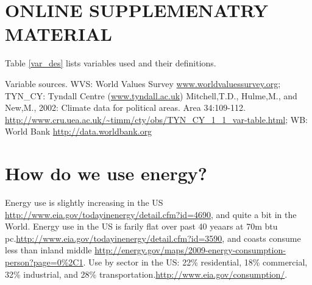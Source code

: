 \documentclass[10pt, letterpaper]{article}
\begin{document}
\begin{spacing}{1.4}







\newpage
\section{ONLINE SUPPLEMENATRY MATERIAL}

Table
\ref{var_des} lists variables used and their definitions.



{\scriptsize \noindent Variable sources. WVS: World Values Survey \url{www.worldvaluessurvey.org};
TYN\_CY: Tyndall Centre (\url{www.tyndall.ac.uk}) Mitchell,T.D., Hulme,M., and
New,M., 2002: Climate data for political areas. Area
34:109-112. \url{http://www.cru.uea.ac.uk/~timm/cty/obs/TYN_CY_1_1_var-table.html};
WB: World Bank \url{http://data.worldbank.org}}




\section{How do we use energy?}

Energy use is slightly increasing in the US
\url{http://www.eia.gov/todayinenergy/detail.cfm?id=4690}, and quite a bit in
the World. 
Energy use in the US is farily flat over past 40 yeaars at 70m btu
pc.\url{http://www.eia.gov/todayinenergy/detail.cfm?id=3590}, and coasts consume
less than inland middle
\url{http://energy.gov/maps/2009-energy-consumption-person?page=0%2C1}. 
Use by sector in the US: 22\% residential, 18\% commercial, 32\% industrial, and
28\% transportation.\url{http://www.eia.gov/consumption/}. 



\end{spacing}
\end{document}
